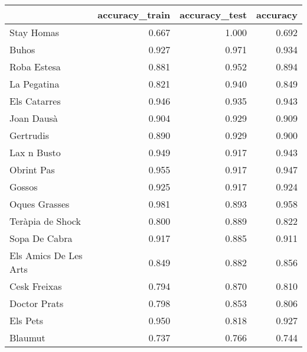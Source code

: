 \begin{tabular}{lrrr}
\toprule
{} &  accuracy\_train &  accuracy\_test &  accuracy \\
\midrule
Stay Homas            &           0.667 &          1.000 &     0.692 \\
Buhos                 &           0.927 &          0.971 &     0.934 \\
Roba Estesa           &           0.881 &          0.952 &     0.894 \\
La Pegatina           &           0.821 &          0.940 &     0.849 \\
Els Catarres          &           0.946 &          0.935 &     0.943 \\
Joan Dausà            &           0.904 &          0.929 &     0.909 \\
Gertrudis             &           0.890 &          0.929 &     0.900 \\
Lax n Busto           &           0.949 &          0.917 &     0.943 \\
Obrint Pas            &           0.955 &          0.917 &     0.947 \\
Gossos                &           0.925 &          0.917 &     0.924 \\
Oques Grasses         &           0.981 &          0.893 &     0.958 \\
Teràpia de Shock      &           0.800 &          0.889 &     0.822 \\
Sopa De Cabra         &           0.917 &          0.885 &     0.911 \\
Els Amics De Les Arts &           0.849 &          0.882 &     0.856 \\
Cesk Freixas          &           0.794 &          0.870 &     0.810 \\
Doctor Prats          &           0.798 &          0.853 &     0.806 \\
Els Pets              &           0.950 &          0.818 &     0.927 \\
Blaumut               &           0.737 &          0.766 &     0.744 \\
\bottomrule
\end{tabular}
